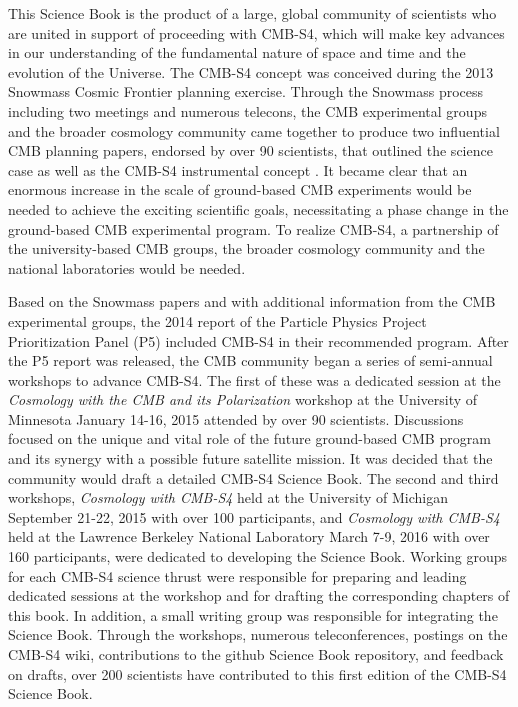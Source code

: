 \documentclass[titlepage]{tcibook}
\begin{document}
This Science Book is the product of a large, global community of scientists who are united in support of proceeding with CMB-S4, which will make key advances in our understanding of the fundamental nature of space and time and the evolution of the Universe.
The CMB-S4 concept was conceived during the 2013 Snowmass Cosmic Frontier planning exercise. Through the Snowmass process including two meetings and numerous telecons, the CMB experimental groups and the broader cosmology community came together to produce two influential CMB planning papers, endorsed by over 90 scientists, that outlined the science case as well as the CMB-S4 instrumental concept \cite{Abazajian:2013vfg,Abazajian:2013oma}.  It became clear that an enormous increase in the scale of ground-based CMB experiments would be needed to achieve the exciting scientific goals, necessitating a phase change in the ground-based CMB experimental program. To realize CMB-S4, a partnership of the university-based CMB groups, the broader cosmology community and the national laboratories would be needed.

Based on the Snowmass papers and with additional information from the CMB experimental groups, the 2014 report of the Particle Physics Project Prioritization Panel (P5) included CMB-S4 in their recommended program.  After the P5 report was released, the CMB community began a series of semi-annual workshops to advance CMB-S4. The first of these was a dedicated session at the  {\it Cosmology with the CMB 
and its Polarization} workshop at the University of Minnesota January 14-16, 2015 attended by over 90 scientists.
Discussions focused on the unique and vital role of the future ground-based CMB program and its synergy with a possible future satellite mission. It was decided that the community would draft a detailed CMB-S4 Science Book.  The second and third workshops, {\it Cosmology with CMB-S4} held at the University of Michigan September 21-22, 2015 with over 100 participants,
and {\it Cosmology with CMB-S4} held at the Lawrence Berkeley National Laboratory March 7-9, 2016 with over 160 participants,
were dedicated to developing the Science Book.  Working groups for each CMB-S4 science thrust were responsible for preparing and leading dedicated sessions at the workshop and for drafting the corresponding chapters of this book. In addition, a small writing group was responsible for integrating the Science Book. Through the workshops, numerous teleconferences, postings on the CMB-S4 wiki, contributions to the github Science Book repository, and feedback on drafts,  over 200 scientists have contributed to this first edition of the CMB-S4 Science Book.
\end{document}
